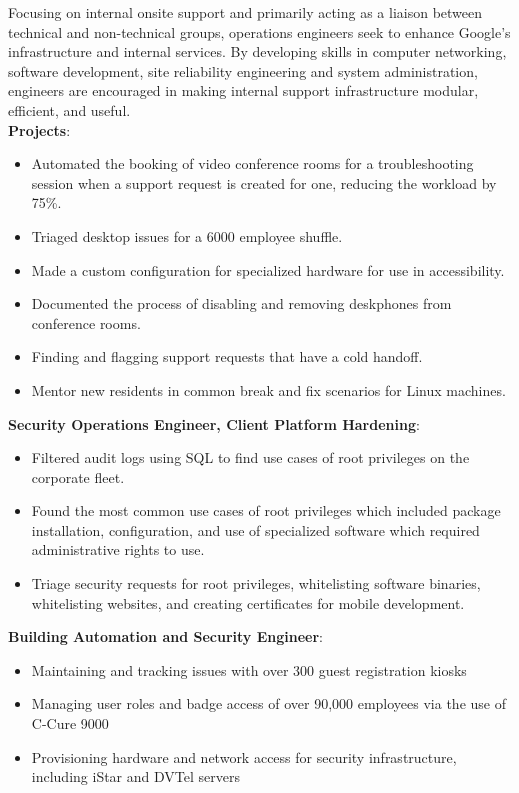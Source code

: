 \documentclass[letter,sans]{moderncv}
\begin{document}
{Focusing on internal onsite support and primarily acting as a liaison between technical and non-technical groups, operations engineers seek to enhance Google's infrastructure and internal services. By developing skills in computer networking, software development, site reliability engineering and system administration, engineers are encouraged in making internal support infrastructure modular, efficient, and useful.\\
  \textbf{Projects}:
  \begin{itemize}
    \item Automated the booking of video conference rooms for a troubleshooting session when a support request is created for one, reducing the workload by 75\%.
    \item Triaged desktop issues for a 6000 employee shuffle.
    \item Made a custom configuration for specialized hardware for use in accessibility.
    \item Documented the process of disabling and removing deskphones from conference rooms.
    \item Finding and flagging support requests that have a cold handoff.
    \item Mentor new residents in common break and fix scenarios for Linux machines.
  \end{itemize}
  \textbf{Security Operations Engineer, Client Platform Hardening}:
  \begin{itemize}
    \item Filtered audit logs using SQL to find use cases of root privileges on the corporate fleet.
    \item Found the most common use cases of root privileges which included package installation, configuration, and use of specialized software which required administrative rights to use.
    \item Triage security requests for root privileges, whitelisting software binaries, whitelisting websites, and creating certificates for mobile development.
  \end{itemize}
  \textbf{Building Automation and Security Engineer}:
  \begin{itemize}
    \item Maintaining and tracking issues with over 300 guest registration kiosks
    \item Managing user roles and badge access of over 90,000 employees via the use of C-Cure 9000
    \item Provisioning hardware and network access for security infrastructure, including iStar and DVTel servers
  \end{itemize}
}
  
\end{document}

